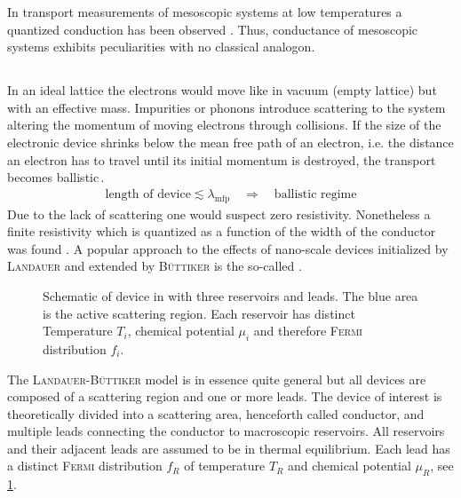 In transport measurements of mesoscopic systems at low temperatures a quantized conduction has been observed \cite{PhysRevLett.45.494}. Thus, conductance of mesoscopic systems exhibits peculiarities with no classical analogon.
\subsection{\clanbform{}}\label{sec:landauerbuettiker}
In an ideal lattice the electrons would move like in vacuum (empty lattice) but with an effective mass. Impurities or phonons introduce scattering to the system altering the momentum of moving electrons through collisions.
If the size of the electronic device shrinks below the mean free path of an electron, i.e. the distance an electron has to travel until its initial momentum is destroyed, the transport becomes ballistic\,\cite{datta1989quantum}. 
\begin{align}
	\text{length of device} \lesssim \lambda_{\text{mfp}}\quad \Rightarrow \quad\text{ballistic regime}
	\label{eqn:meanfreepath}
\end{align}
Due to the lack of scattering one would suspect zero resistivity. Nonetheless a finite resistivity which is quantized as a function of the width of the conductor was found \cite{PhysRevLett.60.848}.
A popular approach to the effects of nano-scale devices initialized by \textsc{Landauer} \cite{PhilMag.21.863} and extended by \textsc{B\"uttiker} is the so-called \lanbform{} \cite{PhysRevB.31.6207}.
\begin{figure}[h]
\centering
{}
\caption{Schematic of device in \lanbform{} with three reservoirs and leads. The blue area is the active scattering region. Each reservoir has distinct Temperature $T_i$, chemical potential $\mu_i$ and therefore \textsc{Fermi} distribution $f_i$.}
\label{fig:lanbform}
\end{figure}
The \textsc{Landauer-B\"uttiker} model is in essence quite general but all devices are composed of a scattering region and one or more leads. The device of interest is theoretically divided into a scattering area, henceforth called conductor, and multiple leads connecting the conductor to macroscopic reservoirs. All reservoirs and their adjacent leads are assumed to be in thermal equilibrium. Each lead has a distinct \textsc{Fermi} distribution $f_R$ of temperature $T_R$ and chemical potential $\mu_R$, see \cref{fig:lanbform}.
